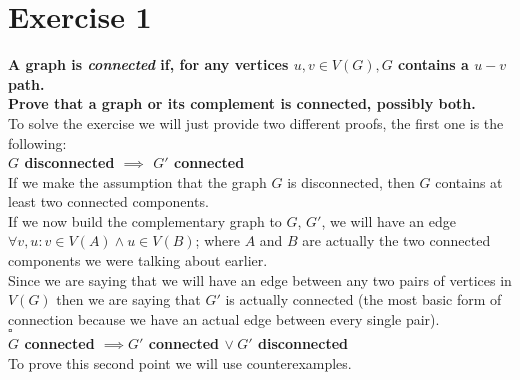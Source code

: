 \section*{Exercise 1}
\boldmath
\textbf{A graph is \textit{connected} if, for any vertices $u, v \in V(G), G$ contains a $u - v$ path.\\
Prove that a graph or its complement is connected, possibly both.}\vspace{10pt}\\
\unboldmath
To solve the exercise we will just provide two different proofs, the first one is the following:\vspace{5pt}\\
\boldmath
\textbf{$G$ disconnected $\implies$ $G'$ connected}\vspace{5pt}\\
\unboldmath
If we make the assumption that the graph $G$ is disconnected, then $G$ contains at least two connected components.\\
If we now build the complementary graph to $G$, $G'$, we will have an edge $\forall v, u : v \in V(A) \land u \in V(B)$; where $A$ and $B$ are actually the two connected components we were talking about earlier.\\
Since we are saying that we will have an edge between any two pairs of vertices in $V(G)$ then we are saying that $G'$ is actually connected (the most basic form of connection because we have an actual edge between every single pair).
\vspace{2pt}\\\hspace*{3cm}$\square$\vspace*{10pt}\\
\boldmath
\textbf{$G$ connected $\implies G'$ connected $\vee\hspace{3pt} G'$ disconnected}\vspace{5pt}\\
\unboldmath
To prove this second point we will use counterexamples. \\
\begin{center}
\hspace*{3cm}
\end{center}
